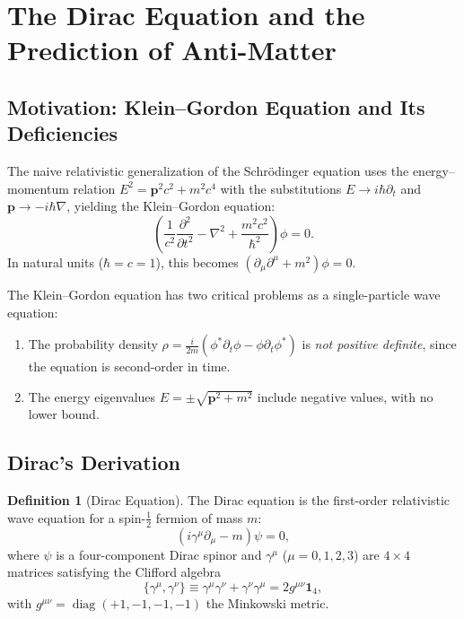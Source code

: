 \documentclass[12pt]{article}
\theoremstyle{definition}
\newtheorem{definition}[theorem]{Definition}
\theoremstyle{remark}
\newcommand{\diag}{\operatorname{diag}}
\begin{document}
\section{The Dirac Equation and the Prediction of Anti-Matter}
\label{sec:dirac}

\subsection{Motivation: Klein--Gordon Equation and Its Deficiencies}

The naive relativistic generalization of the Schr\"odinger equation uses the
energy--momentum relation $E^2 = \mathbf{p}^2 c^2 + m^2 c^4$ with the substitutions
$E \to i\hbar \partial_t$ and $\mathbf{p} \to -i\hbar \nabla$, yielding the
Klein--Gordon equation:
\begin{equation}
\label{eq:klein_gordon}
\left( \frac{1}{c^2}\frac{\partial^2}{\partial t^2} - \nabla^2 + \frac{m^2 c^2}{\hbar^2} \right) \phi = 0.
\end{equation}
In natural units ($\hbar = c = 1$), this becomes $(\partial_\mu \partial^\mu + m^2)\phi = 0$.

The Klein--Gordon equation has two critical problems as a single-particle wave equation:
\begin{enumerate}
    \item The probability density $\rho = \frac{i}{2m}\left(\phi^* \partial_t \phi - \phi \partial_t \phi^*\right)$ is \emph{not positive definite}, since the equation is second-order in time.
    \item The energy eigenvalues $E = \pm\sqrt{\mathbf{p}^2 + m^2}$ include negative values, with no lower bound.
\end{enumerate}

\subsection{Dirac's Derivation}

\begin{definition}[Dirac Equation]
\label{def:dirac_eq}
The Dirac equation is the first-order relativistic wave equation for a spin-$\frac{1}{2}$
fermion of mass $m$:
\begin{equation}
\label{eq:dirac}
(i\gamma^\mu \partial_\mu - m)\psi = 0,
\end{equation}
where $\psi$ is a four-component Dirac spinor and $\gamma^\mu$ ($\mu = 0,1,2,3$) are
$4 \times 4$ matrices satisfying the Clifford algebra
\begin{equation}
\label{eq:clifford}
\{\gamma^\mu, \gamma^\nu\} \equiv \gamma^\mu \gamma^\nu + \gamma^\nu \gamma^\mu = 2g^{\mu\nu} \mathbf{1}_4,
\end{equation}
with $g^{\mu\nu} = \diag(+1,-1,-1,-1)$ the Minkowski metric.
\end{definition}
\end{document}
